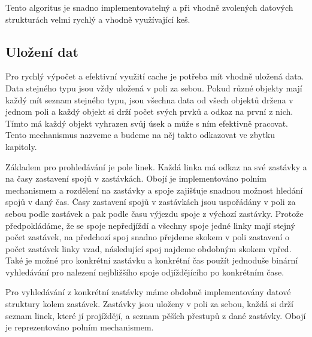 Tento algoritus je snadno implementovatelný a při vhodně zvolených datových
strukturách velmi rychlý a vhodně využívající keš. 

\subsection{Uložení dat}
Pro rychlý výpočet a efektivní využití cache je potřeba mít vhodně uložená data.
Data stejného typu jsou vždy uložená v poli za sebou. Pokud různé objekty mají
každý mít seznam stejného typu, jsou všechna data od všech objektů držena v
jednom poli a každý objekt si drží počet svých prvků a odkaz na první z nich.
Tímto má každý objekt vyhrazen svůj úsek a může s ním efektivně pracovat. Tento
mechanismus nazveme  a budeme na něj takto odkazovat ve
zbytku kapitoly.

Základem pro prohledávání je pole linek. Každá linka má odkaz na své zastávky a
na časy zastavení spojů v zastávkách. Obojí je implementováno polním mechanismem
a rozdělení na zastávky a spoje zajišťuje snadnou možnost hledání spojů v daný
čas. Časy zastavení spojů v zastávkách jsou uspořádány v poli za sebou podle
zastávek a pak podle času výjezdu spoje z výchozí zastávky. Protože
předpokládáme, že se spoje nepředjíždí a všechny spoje jedné linky mají stejný
počet zastávek, na předchozí spoj snadno přejdeme skokem v poli zastavení o
počet zastávek linky vzad, následující spoj najdeme obdobným skokem vpřed. Také
je možné pro konkrétní zastávku a konkrétní čas použít jednoduše binární
vyhledávání pro nalezení nejbližšího spoje odjíždějícího po konkrétním čase. 

Pro vyhledávání z konkrétní zastávky máme obdobně implementovány datové
struktury kolem zastávek. Zastávky jsou uloženy v poli za sebou, každá si drží
seznam linek, které jí projíždějí, a seznam pěších přestupů z dané zastávky. 
Obojí je reprezentováno polním mechanismem.   

